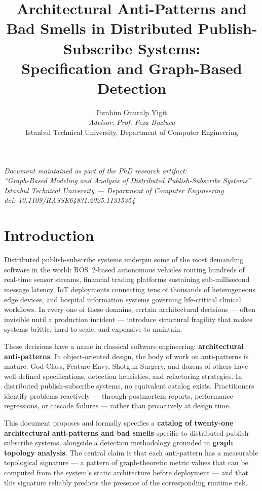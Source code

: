 \documentclass[11pt]{article}
\title{Architectural Anti-Patterns and Bad Smells in Distributed Publish-Subscribe Systems:\\
Specification and Graph-Based Detection}
\author{Ibrahim Onuralp Yigit \\ \emph{Advisor: Prof. Feza Buzluca} \\[4pt]
\small Istanbul Technical University, Department of Computer Engineering}
\date{}
\begin{document}
\maketitle

\begin{center}
\emph{Document maintained as part of the PhD research artifact:} \\
\emph{``Graph-Based Modeling and Analysis of Distributed Publish-Subscribe Systems''} \\
\emph{Istanbul Technical University --- Department of Computer Engineering} \\
\emph{doi: 10.1109/RASSE64831.2025.11315354}
\end{center}

\tableofcontents
\clearpage

\section{Introduction}

Distributed publish-subscribe systems underpin some of the most demanding software in the world: ROS~2-based autonomous vehicles routing hundreds of real-time sensor streams, financial trading platforms sustaining sub-millisecond message latency, IoT deployments connecting tens of thousands of heterogeneous edge devices, and hospital information systems governing life-critical clinical workflows. In every one of these domains, certain architectural decisions --- often invisible until a production incident --- introduce structural fragility that makes systems brittle, hard to scale, and expensive to maintain.

These decisions have a name in classical software engineering: \textbf{architectural anti-patterns}. In object-oriented design, the body of work on anti-patterns is mature: God Class, Feature Envy, Shotgun Surgery, and dozens of others have well-defined specifications, detection heuristics, and refactoring strategies. In distributed publish-subscribe systems, no equivalent catalog exists. Practitioners identify problems reactively --- through postmortem reports, performance regressions, or cascade failures --- rather than proactively at design time.

This document proposes and formally specifies a \textbf{catalog of twenty-one architectural anti-patterns and bad smells} specific to distributed publish-subscribe systems, alongside a detection methodology grounded in \textbf{graph topology analysis}. The central claim is that each anti-pattern has a measurable topological signature --- a pattern of graph-theoretic metric values that can be computed from the system's static architecture before deployment --- and that this signature reliably predicts the presence of the corresponding runtime risk.
\end{document}
